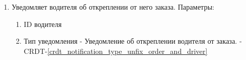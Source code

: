 \begin{alg}
\begin{enumerate}
\begin{enumerate}
                \item Уведомляет водителя об откреплении от него заказа. Параметры:

                  \begin{enumerate}
                    \item ID водителя
                    \item Тип уведомления - Уведомление об откреплении водителя от заказа.  - CRDT-\ref{crdt_notification_type_unfix_order_and_driver}
                  \end{enumerate}

              \end{enumerate}

	        \end{enumerate}

        	\end{alg}